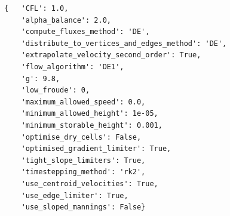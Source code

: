 \begin{verbatim}
{   'CFL': 1.0,
    'alpha_balance': 2.0,
    'compute_fluxes_method': 'DE',
    'distribute_to_vertices_and_edges_method': 'DE',
    'extrapolate_velocity_second_order': True,
    'flow_algorithm': 'DE1',
    'g': 9.8,
    'low_froude': 0,
    'maximum_allowed_speed': 0.0,
    'minimum_allowed_height': 1e-05,
    'minimum_storable_height': 0.001,
    'optimise_dry_cells': False,
    'optimised_gradient_limiter': True,
    'tight_slope_limiters': True,
    'timestepping_method': 'rk2',
    'use_centroid_velocities': True,
    'use_edge_limiter': True,
    'use_sloped_mannings': False}
\end{verbatim}

